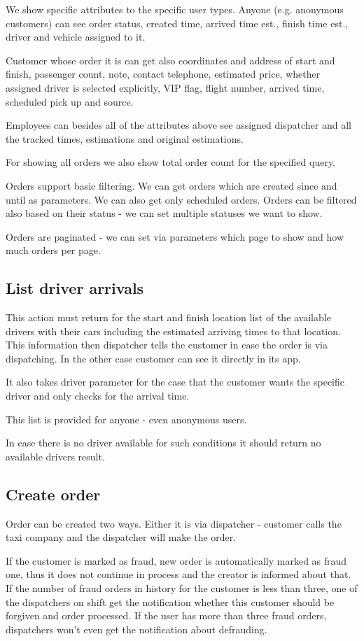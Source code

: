 			We show specific attributes to the specific user types. Anyone (e.g. anonymous customers) can see order status, created time, arrived time est., finish time est.,  driver and vehicle assigned to it. 
			
			Customer whose order it is can get also coordinates and address of start and finish, passenger count, note, contact telephone, estimated price, whether assigned driver is selected explicitly, VIP flag, flight number, arrived time, scheduled pick up and source.
			
			Employees can besides all of the attributes above  see assigned dispatcher and all the tracked times, estimations and original estimations.
			
			For showing all orders we also show total order count for the specified query.
			
			Orders support basic filtering. We can get orders which are created since and until as parameters. We can also get only scheduled orders. Orders can be filtered also based on their status - we can set multiple statuses we want to show.
			
			Orders are paginated - we can set via parameters which page to show and how much orders per page.
			
			
		\subsection{List driver arrivals}
		This action must return for the start and finish location list of the available drivers with their cars including the estimated arriving times to that location. This information then dispatcher tells the customer in case the order is via dispatching. In the other case customer can see it directly in its app.
		
		It also takes driver parameter for the case that the customer wants the specific driver and only checks for the arrival time.
		
		This list is provided for anyone - even anonymous users.
		
		In case there is no driver available for such conditions it should return no available drivers result.
		\subsection{Create order}
			Order can be created two ways. Either it is via dispatcher - customer calls the taxi company and the dispatcher will make the order. 
			
			If the customer is marked as fraud, new order is automatically marked as fraud one, thus it does not continue in process and the creator is informed about that. If the number of fraud orders in history for the customer is less than three, one of the dispatchers on shift get the notification whether this customer should be forgiven and order processed. If the user has more than three fraud orders, dispatchers won't even get the notification about defrauding.
			
